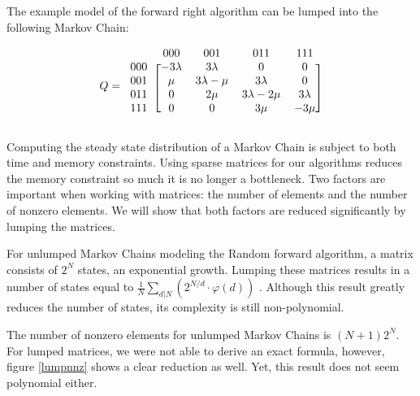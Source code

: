 \documentclass[10pt,a4paper]{article}
\begin{document}
The example model of the forward right algorithm can be lumped into the following Markov Chain:

\[ Q =
  \begin{blockarray}{ccccc}
    & 000 & 001 & 011 & 111 \\
    \begin{block}{c[cccc]}
    000 & -3\lambda & 3\lambda & 0 & 0 \\
    001 & \mu & 3\lambda-\mu & 3\lambda & 0 \\
    011 & 0 & 2\mu & 3\lambda-2\mu & 3\lambda \\
    111 & 0 & 0 & 3\mu & -3\mu \\
    \end{block}
  \end{blockarray}
\]

Computing the steady state distribution of a Markov Chain is subject to both time and memory constraints. Using sparse matrices for our algorithms reduces the memory constraint so much it is no longer a bottleneck.
Two factors are important when working with matrices: the number of elements and the number of nonzero elements. We will show that both factors are reduced significantly by lumping the matrices.

For unlumped Markov Chains modeling the Random forward algorithm, a matrix consists of $2^N$ states, an exponential growth. Lumping these matrices results in a number of states equal to  $\frac{1}{N} \sum_{d|N} (2^{N/d} \cdot \varphi(d) )$ \cite{A000031}. Although this result greatly reduces the number of states, its complexity is still non-polynomial.

The number of nonzero elements for unlumped Markov Chains is $(N+1) 2^N$. For lumped matrices, we were not able to derive an exact formula, however, figure \ref{lumpnnz} shows a clear reduction as well. Yet, this result does not seem polynomial either.
\end{document}

